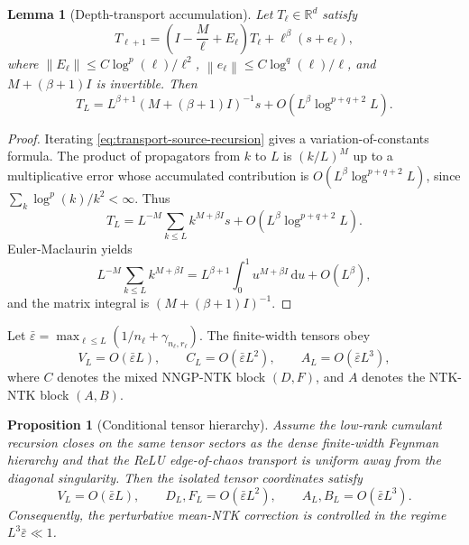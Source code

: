 \documentclass{article}
\newtheorem{proposition}[theorem]{Proposition}
\newtheorem{lemma}[theorem]{Lemma}
\newcommand{\R}{\mathbb R}
\newcommand{\barE}{\bar\varepsilon}
\newcommand{\dd}{\mathrm d}
\newcommand{\norm}[1]{\left\lVert #1\right\rVert}
\begin{document}
\begin{lemma}[Depth-transport accumulation]
\label{lem:transport-source}
Let \(T_\ell\in\R^d\) satisfy
\begin{equation}
T_{\ell+1}
=\left(I-\frac{M}{\ell}+E_\ell\right)T_\ell+\ell^\beta(s+e_\ell),
\label{eq:transport-source-recursion}
\end{equation}
where \(\norm{E_\ell}\le C\log^p(\ell)/\ell^2\), \(\norm{e_\ell}\le C\log^q(\ell)/\ell\), and \(M+(\beta+1)I\) is invertible. Then
\begin{equation}
T_L
=L^{\beta+1}\left(M+(\beta+1)I\right)^{-1}s
+O\left(L^\beta\log^{p+q+2}L\right).
\label{eq:transport-source-solution}
\end{equation}
\end{lemma}

\begin{proof}
Iterating \eqref{eq:transport-source-recursion} gives a variation-of-constants formula. The product of propagators from \(k\) to \(L\) is \((k/L)^M\) up to a multiplicative error whose accumulated contribution is \(O(L^\beta\log^{p+q+2}L)\), since \(\sum_k\log^p(k)/k^2<\infty\). Thus
\[
T_L=L^{-M}\sum_{k\le L} k^{M+\beta I}s+O(L^\beta\log^{p+q+2}L).
\]
Euler-Maclaurin yields
\[
L^{-M}\sum_{k\le L} k^{M+\beta I}
=L^{\beta+1}\int_0^1u^{M+\beta I}\,\dd u+O(L^\beta),
\]
and the matrix integral is \((M+(\beta+1)I)^{-1}\).
\end{proof}

Let \(\barE=\max_{\ell\le L}(1/n_\ell+\gamma_{n_\ell,r_\ell})\). The finite-width tensors obey
\begin{equation}
V_L=O(\barE L),\qquad C_L=O(\barE L^2),\qquad A_L=O(\barE L^3),
\label{eq:main-scales}
\end{equation}
where \(C\) denotes the mixed NNGP-NTK block \((D,F)\), and \(A\) denotes the NTK-NTK block \((A,B)\).

\begin{proposition}[Conditional tensor hierarchy]
\label{prop:tensor-hierarchy}
Assume the low-rank cumulant recursion closes on the same tensor sectors as the dense finite-width Feynman hierarchy and that the ReLU edge-of-chaos transport is uniform away from the diagonal singularity. Then the isolated tensor coordinates satisfy
\begin{equation}
V_L=O(\barE L),\qquad
D_L,F_L=O(\barE L^2),\qquad
A_L,B_L=O(\barE L^3).
\label{eq:tensor-hierarchy}
\end{equation}
Consequently, the perturbative mean-NTK correction is controlled in the regime \(L^3\barE\ll 1\).
\end{proposition}
\end{document}
